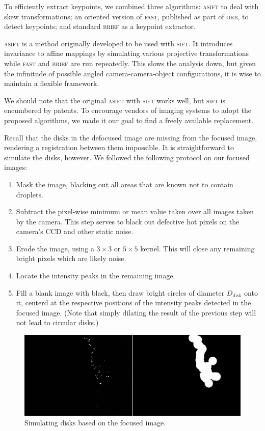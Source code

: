 \documentclass[11.5pt,oneside]{book}
\begin{document}
To efficiently extract keypoints, we combined three algorithms:
\textsc{asift} \cite{Morel09} to deal with skew transformations; an oriented version of
\textsc{fast}, published as part of \textsc{orb}, to detect keypoints; and
standard \textsc{brief} as a keypoint extractor.

\textsc{asift} is a method originally developed to be used with \textsc{sift}.
It introduces invariance to affine mappings by simulating various
projective transformations while \textsc{fast} and \textsc{brief} are run repeatedly.
This slows the analysis down, but given the infinitude of
possible angled camera-camera-object configurations, it is wise to maintain a
flexible framework.

We should note that the original \textsc{asift} with
\textsc{sift} works well, but \textsc{sift} is encumbered by patents. To
encourage vendors of imaging systems to adopt the proposed algorithms, we made
it our goal to find a freely available replacement.

Recall that the disks in the defocused image are missing from the focused image,
rendering a registration between them impossible. It is straightforward to
simulate the disks, however. We followed the following protocol on our focused
images:
\begin{enumerate}
    \item Mask the image, blacking out all areas that are known not to contain
        droplets.
    \item Subtract the pixel-wise minimum or mean value taken over all images
        taken by the camera. This step serves to black out defective hot pixels
        on the camera's CCD and other static noise.
    \item Erode the image, using a $3\times 3$ or $5\times 5$ kernel. This will
        close any remaining bright pixels which are likely noise.
    \item Locate the intensity peaks in the remaining image.
    \item Fill a blank image with black, then draw bright circles of diameter
        $D_\text{disk}$ onto it, centerd at the respective positions of the
        intensity peaks detected in the focused image. (Note that simply dilating
        the result of the previous step will not lead to circular disks.)
\end{enumerate}
\begin{figure}
    \centering
    \includegraphics[width=\textwidth]{img/orb/dilation.jpg}
    \caption{Simulating disks based on the focused image. \label{fig:making-disks}}
\end{figure}
\end{document}
